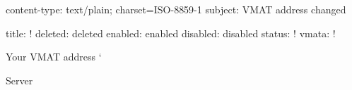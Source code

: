 content-type: text/plain; charset=ISO-8859-1
subject: VMAT address changed

title:  !
deleted: deleted
enabled: enabled
disabled: disabled
status: !
vmata: !

Your VMAT address `%


Server %